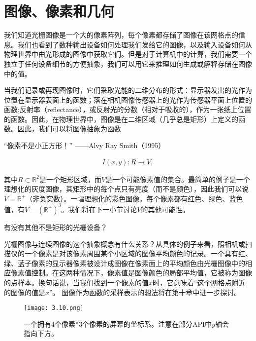 \documentclass[lang=cn,12pt]{elegantbook}
\begin{document}
\section{图像、像素和几何}

我们知道光栅图像是一个大的像素阵列，每个像素都存储了图像在该网格点的信息。我们也看到了数种输出设备如何处理我们发给它的图像，以及输入设备如何从物理世界中由光形成的图像中获取它们。但是对于计算机中的计算，我们需要一个独立于任何设备细节的方便抽象，我们可以用它来推理如何生成或解释存储在图像中的值。

当我们记录或再现图像时，它们采取光能的二维分布的形式：显示器发出的光作为位置在显示器表面上的函数；落在相机图像传感器上的光作为传感器平面上位置的函数;反射率（reflectance），或反射光的分数（相对于吸收的），作为一张纸上位置的函数。因此，在物理世界中，图像是在二维区域（几乎总是矩形）上定义的函数。因此，我们可以将图像抽象为函数

\begin{note}
“像素不是小正方形！”  ——Alvy Ray Smith（1995）
\end{note}


\[
  \begin{aligned}
  I(x,y):R\rightarrow V,
  \end{aligned}
\]

其中$R\subset \mathbb{R} ^2$是一个矩形区域，而$V$是一个可能像素值的集合。最简单的例子是一个理想化的灰度图像，其矩形中的每个点只有亮度（而不是颜色），因此我们可以说$V=\mathbb{R}^{+}$（非负实数）。一幅理想化的彩色图像，每个像素都有红色、绿色、蓝色值，有$V=(\mathbb{R}^{+})^3$。我们将在下一小节讨论$V$的其他可能性。

\begin{note}
有没有其他不是矩形的光栅设备？
\end{note}

光栅图像与连续图像的这个抽象概念有什么关系？从具体的例子来看，照相机或扫描仪的一个像素是对该像素周围某个小区域的图像平均颜色的记录。一个具有红、绿、蓝子像素的显示器像素被设计成图像在像素面上的平均颜色由光栅图像中的相应像素值控制。在这两种情况下，像素值是图像颜色的局部平均值，它被称为图像的点样本。换句话说，当我们找到一个像素的值$x$时，它意味着“这个网格点附近的图像的值是$x$”。 图像作为函数的采样表示的想法将在第十章中进一步探讨。

\begin{figure}[htb]
  \centering
  \texttt{[image: 3.10.png]}
  \caption{一个拥有4个像素*3个像素的屏幕的坐标系。注意在部分API中$y$轴会指向下方。}
\end{figure}
\end{document}
